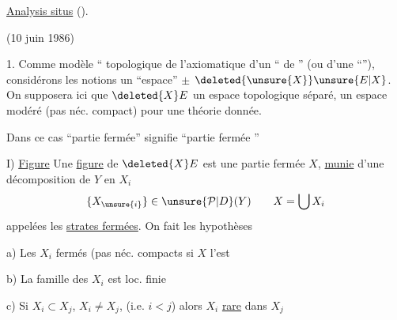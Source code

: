 \uline{Analysis situs} ().

(10 juin 1986)

1. Comme modèle `` topologique de l'axiomatique d'un `` de  '' (ou d'une ``\uline{}''),
considérons les notions    un ``espace'' $\pm$  $\deleted{\unsure{X}}\unsure{E|X}$.
On supposera ici que $\deleted{X}E$  un espace topologique séparé,  un espace modéré (pas néc. compact) pour une théorie  donnée.

Dans ce cas ``partie fermée'' signifie ``partie fermée ''

I) \uline{Figure} \qquad Une \uline{figure}  de $\deleted{X}E$ est une partie fermée $X$, \uline{munie} d'une
décomposition de $Y$ en   $X_i$
\[
\{X_{\unsure{i}}\}\in\unsure{\mathcal{P}|D}(Y) \qquad X=\bigcup X_i
\]
appelées les \uline{strates fermées}. On fait les hypothèses

a) Les $X_i$ fermés  (pas néc. compacts \unsure{\}}   si $X$ l'est\unsure{)}

b) La famille des $X_i$ est loc. finie

c) Si   $X_i\subset X_j$, $X_i\ne X_j$, (i.e. $i<j$) alors $X_i$ \uline{rare} dans $X_j$

